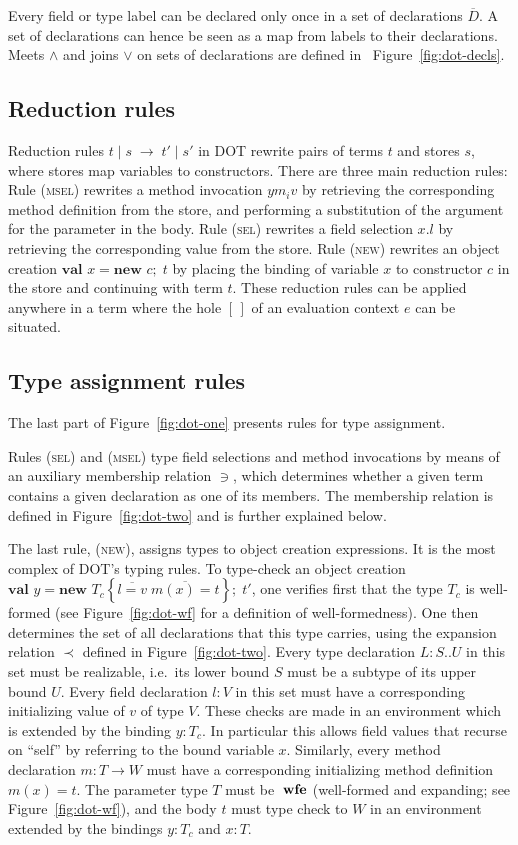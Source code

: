 \documentclass[9pt]{sigplanconf}
\newcommand{\figref}[1]
        {Figure~\ref{fig:#1}}
\newcommand{\expand}{\prec}
\newcommand{\reduces}{\;\rightarrow\;}
\newcommand{\wfe}{\;\mbox{\textbf{wfe}}}
\newcommand{\tfun}{\rightarrow}
\newcommand{\ldefs}[1]{\left\{#1\right\}}
\newcommand{\seq}[1]{\overline{#1}}
\newcommand{\new}[3]{\textbf{val }#1 = \textbf{new }#2 ;\; #3}
\newcommand{\Ldecl}[3]{#1 : #2..#3}%
\newcommand{\ldecl}[2]{#1 : #2}
\newcommand{\mdecl}[3]{#1 : #2 \tfun #3}
\newcommand{\reduction}[4]{#1 \operatorname{|} #2 \reduces #3 \operatorname{|} #4}
\begin{document}
Every field or type label can be declared only once in a set of
declarations $\seq D$. A set of declarations can hence be seen as a map from
labels to their declarations.  Meets $\wedge$ and joins $\vee$ on sets of
declarations are defined in ~\figref{dot-decls}.

\subsection*{Reduction rules}

Reduction rules $\reduction t s {t'} {s'}$ in DOT rewrite pairs of
terms $t$ and stores $s$, where stores map variables to constructors.
There are three main reduction rules: Rule (\textsc{msel}) rewrites a
method invocation $y {m_i} v$ by retrieving the corresponding method
definition from the store, and performing a substitution of the
argument for the parameter in the body. Rule (\textsc{sel}) rewrites a
field selection $x.l$ by retrieving the corresponding value from the
store. Rule (\textsc{new}) rewrites an object creation $\new x c t$ by
placing the binding of variable $x$ to constructor $c$ in the store
and continuing with term $t$.  These reduction rules can be applied
anywhere in a term where the hole $[\,]$ of an evaluation context $e$
can be situated.

\subsection*{Type assignment rules}

The last part of \figref{dot-one} presents rules for type
assignment.  

Rules (\textsc{sel}) and (\textsc{msel}) type field selections and
method invocations by means of an auxiliary membership relation $\ni$,
which determines whether a given term contains a given declaration as
one of its members. The membership relation is defined in
\figref{dot-two} and is further explained below.

The last rule, (\textsc{new}), assigns types to object creation
expressions. It is the most complex of DOT's typing rules.  To
type-check an object creation $\new y {T_c \ldefs {\seq{l =
      v}\;\seq{m(x) = t}}} t'$, one verifies first that the type $T_c$
is well-formed (see \figref{dot-wf} for a definition of
well-formedness).  One then determines the set of all declarations
that this type carries, using the expansion relation $\expand$ defined
in \figref{dot-two}.  Every type declaration $\Ldecl L S U$ in
this set must be realizable, i.e.\ its lower bound $S$ must be a
subtype of its upper bound $U$.  Every field declaration $\ldecl l V$
in this set must have a corresponding initializing value of $v$ of
type $V$.  These checks are made in an environment which is extended
by the binding $y: T_c$. In particular this allows field values that
recurse on ``self'' by referring to the bound variable $x$. Similarly,
every method declaration $\mdecl m T W$ must have a corresponding
initializing method definition $m(x) = t$. The parameter type $T$ must
be $\wfe$ (well-formed and expanding; see \figref{dot-wf}), and
the body $t$ must type check to $W$ in an environment extended by the
bindings $y : T_c$ and $x : T$.
\end{document}

